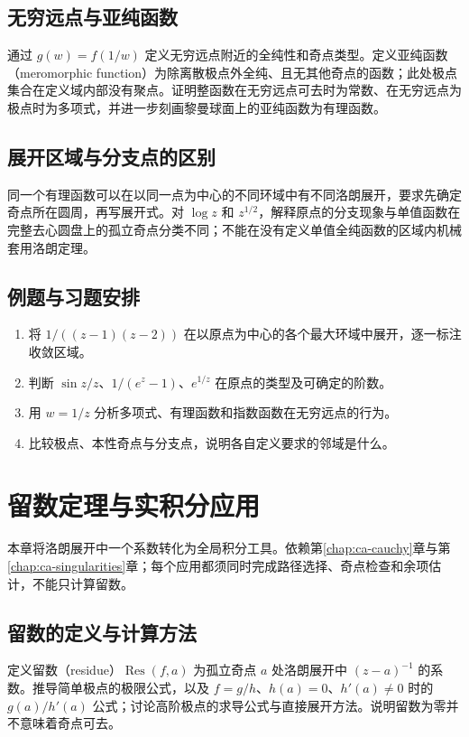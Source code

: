 \documentclass[UTF8,12pt,a4paper,fontset=fandol]{ctexbook}
\begin{document}
\section{无穷远点与亚纯函数}
通过 $g(w)=f(1/w)$ 定义无穷远点附近的全纯性和奇点类型。定义亚纯函数（meromorphic function）为除离散极点外全纯、且无其他奇点的函数；此处极点集合在定义域内部没有聚点。证明整函数在无穷远点可去时为常数、在无穷远点为极点时为多项式，并进一步刻画黎曼球面上的亚纯函数为有理函数。

\section{展开区域与分支点的区别}
同一个有理函数可以在以同一点为中心的不同环域中有不同洛朗展开，要求先确定奇点所在圆周，再写展开式。对 $\log z$ 和 $z^{1/2}$，解释原点的分支现象与单值函数在完整去心圆盘上的孤立奇点分类不同；不能在没有定义单值全纯函数的区域内机械套用洛朗定理。

\section{例题与习题安排}
\begin{enumerate}
  \item 将 $1/((z-1)(z-2))$ 在以原点为中心的各个最大环域中展开，逐一标注收敛区域。
  \item 判断 $\sin z/z$、$1/(e^z-1)$、$e^{1/z}$ 在原点的类型及可确定的阶数。
  \item 用 $w=1/z$ 分析多项式、有理函数和指数函数在无穷远点的行为。
  \item 比较极点、本性奇点与分支点，说明各自定义要求的邻域是什么。
\end{enumerate}

\chapter{留数定理与实积分应用}
\label{chap:ca-residues}

本章将洛朗展开中一个系数转化为全局积分工具。依赖第\ref{chap:ca-cauchy}章与第\ref{chap:ca-singularities}章；每个应用都须同时完成路径选择、奇点检查和余项估计，不能只计算留数。

\section{留数的定义与计算方法}
定义留数（residue）$\operatorname{Res}(f,a)$ 为孤立奇点 $a$ 处洛朗展开中 $(z-a)^{-1}$ 的系数。推导简单极点的极限公式，以及 $f=g/h$、$h(a)=0$、$h'(a)\ne0$ 时的 $g(a)/h'(a)$ 公式；讨论高阶极点的求导公式与直接展开方法。说明留数为零并不意味着奇点可去。
\end{document}
